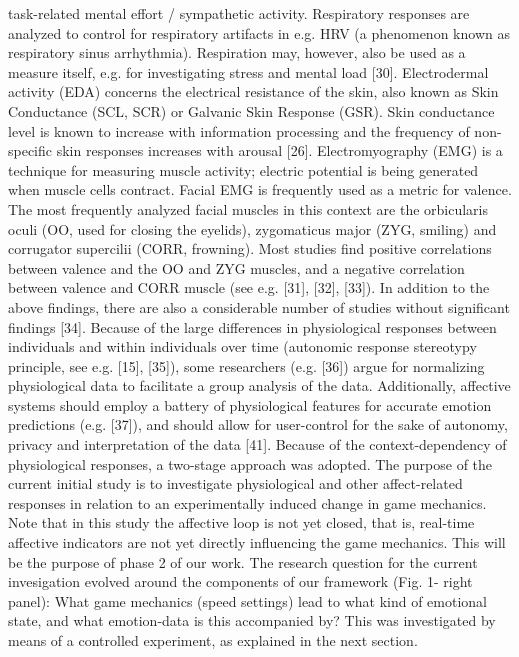 \documentclass{uofsthesis-cs}
\begin{document}
task-related mental effort / sympathetic activity. Respiratory responses are analyzed to control for respiratory artifacts in e.g. HRV (a phenomenon known as respiratory sinus arrhythmia). Respiration may, however, also be used as a measure itself, e.g. for investigating stress and mental load [30]. Electrodermal activity (EDA) concerns the electrical resistance of the skin, also known as Skin Conductance (SCL, SCR) or Galvanic Skin Response (GSR). Skin conductance level is known to increase with information processing and the frequency of non-specific skin responses increases with arousal [26]. Electromyography (EMG) is a technique for measuring muscle activity; electric potential is being generated when muscle cells contract. Facial EMG is frequently used as a metric for valence. The most frequently analyzed facial muscles in this context are the orbicularis oculi (OO, used for closing the eyelids), zygomaticus major (ZYG, smiling) and corrugator supercilii (CORR, frowning). Most studies find positive correlations between valence and the OO and ZYG muscles, and a negative correlation between valence and CORR muscle (see e.g. [31], [32], [33]). In addition to the above findings, there are also a considerable number of studies without significant findings [34]. Because of the large differences in physiological responses between individuals and within individuals over time (autonomic response stereotypy principle, see e.g. [15], [35]), some researchers (e.g. [36]) argue for normalizing physiological data to facilitate a group analysis of the data. Additionally, affective systems should employ a battery of physiological features for accurate emotion predictions (e.g. [37]), and should allow for user-control for the sake of autonomy, privacy and interpretation of the data [41]. Because of the context-dependency of physiological responses, a two-stage approach was adopted. The purpose of the current initial study is to investigate physiological and other affect-related responses in relation to an experimentally induced change in game mechanics. Note that in this study the affective loop is not yet closed, that is, real-time affective indicators are not yet directly influencing the game mechanics. This will be the purpose of phase 2 of our work. The research question for the current invesigation evolved around the components of our framework (Fig. 1- right panel): What game mechanics (speed settings) lead to what kind of emotional state, and what emotion-data is this accompanied by? This was investigated by means of a controlled experiment, as explained in the next section.
\end{document}
